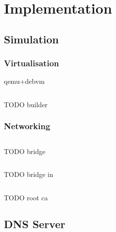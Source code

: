\chapter{Implementation}\label{Implementation}

\blindtext









\section{Simulation}

\blindtext

\subsection{Virtualisation}

qemu+debvm
\blindtext

\begin{listing}[ht]
\inputminted{bash}{snippets/build.bash}
\caption{TODO builder}
\end{listing}

\subsection{Networking}

\blindtext

\begin{listing}[ht]
\inputminted{bash}{snippets/br0.bash}
\caption{TODO bridge}
\end{listing}

\blindtext

\begin{listing}[ht]
\inputminted{ini}{snippets/br0.ini}
\caption{TODO bridge in}
\end{listing}

\blindtext

\begin{listing}[ht]
\inputminted{bash}{snippets/root.bash}
\caption{TODO root ca}
\end{listing}

\blindtext










\section{DNS Server}

